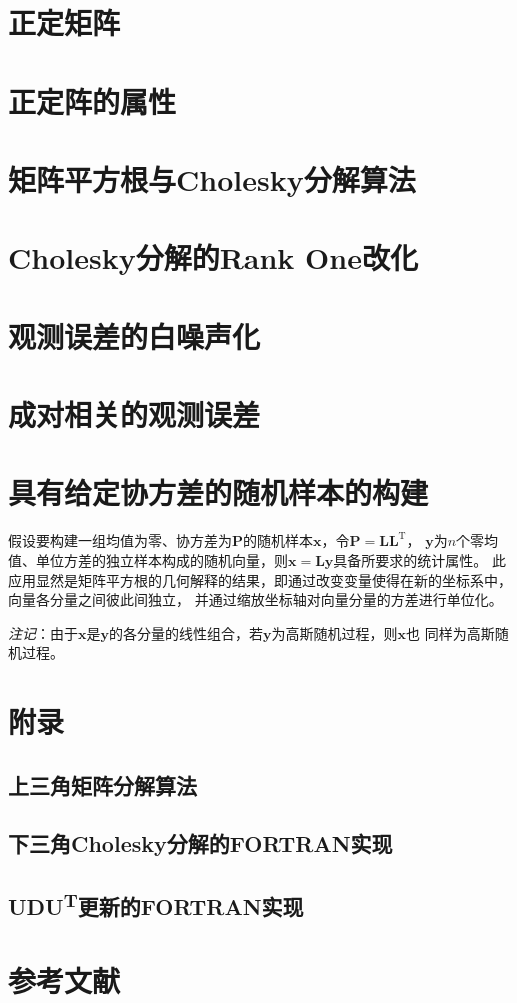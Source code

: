 \documentclass[./book.tex]{subfiles}
\begin{document}
\section{正定矩阵}

\section{正定阵的属性}

\section{矩阵平方根与Cholesky分解算法}

\section{Cholesky分解的Rank One改化}

\section{观测误差的白噪声化}

\section{成对相关的观测误差}

\section{具有给定协方差的随机样本的构建}
假设要构建一组均值为零、协方差为\(\bm{P}\)的随机样本\(\bm{x}\)，令\(\bm{P}=\bm{L}\bm{L}^{\textrm{T}}\)，
\(\bm{y}\)为\(n\)个零均值、单位方差的独立样本构成的随机向量，则\(\bm{x}=\bm{Ly}\)具备所要求的统计属性。
此应用显然是矩阵平方根的几何解释的结果，即通过改变变量使得在新的坐标系中，向量各分量之间彼此间独立，
并通过缩放坐标轴对向量分量的方差进行单位化。

\emph{注记}：由于\(\bm{x}\)是\(\bm{y}\)的各分量的线性组合，若\(\bm{y}\)为高斯随机过程，则\(\bm{x}\)也
同样为高斯随机过程。

\section{附录}

\subsection{上三角矩阵分解算法}

\subsection{下三角Cholesky分解的FORTRAN实现}

\subsection{\texorpdfstring{UDU\textsuperscript{T}}{UDUT}更新的FORTRAN实现}

\section{参考文献}
\end{document}

